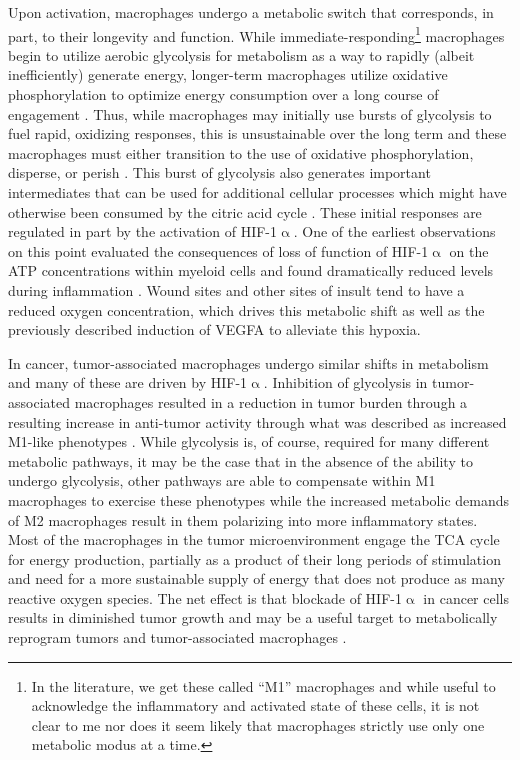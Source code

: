 Upon activation, macrophages undergo a metabolic switch that corresponds, in part, to their longevity and function. While immediate-responding\footnote{In the literature, we get these called ``M1'' macrophages and while useful to acknowledge the inflammatory and activated state of these cells, it is not clear to me nor does it seem likely that macrophages strictly use only one metabolic modus at a time.} macrophages begin to utilize aerobic glycolysis for metabolism as a way to rapidly (albeit inefficiently) generate energy, longer-term macrophages utilize oxidative phosphorylation to optimize energy consumption over a long course of engagement \citep{Kiran2016, Viola2019, Langston2017}. Thus, while macrophages may initially use bursts of glycolysis to fuel rapid, oxidizing responses, this is unsustainable over the long term and these macrophages must either transition to the use of oxidative phosphorylation, disperse, or perish \citep{Odegaard2011}. This burst of glycolysis also generates important intermediates that can be used for additional cellular processes which might have otherwise been consumed by the citric acid cycle \citep{Viola2019}. These initial responses are regulated in part by the activation of HIF-1$\upalpha$. One of the earliest observations on this point evaluated the consequences of loss of function of HIF-1$\upalpha$ on the ATP concentrations within myeloid cells and found dramatically reduced levels during inflammation \citep{Cramer2003}. Wound sites and other sites of insult tend to have a reduced oxygen concentration, which drives this metabolic shift as well as the previously described induction of VEGFA to alleviate this hypoxia. 

In cancer, tumor-associated macrophages undergo similar shifts in metabolism and many of these are driven by HIF-1$\upalpha$. Inhibition of glycolysis in tumor-associated macrophages resulted in a reduction in tumor burden through a resulting increase in anti-tumor activity through what was described as increased M1-like phenotypes \citep{Mehla2019}. While glycolysis is, of course, required for many different metabolic pathways, it may be the case that in the absence of the ability to undergo glycolysis, other pathways are able to compensate within M1 macrophages to exercise these phenotypes while the increased metabolic demands of M2 macrophages result in them polarizing into more inflammatory states. Most of the macrophages in the tumor microenvironment engage the TCA cycle for energy production, partially as a product of their long periods of stimulation and need for a more sustainable supply of energy that does not produce as many reactive oxygen species. The net effect is that blockade of HIF-1$\upalpha$ in cancer cells results in diminished tumor growth and may be a useful target to metabolically reprogram tumors and tumor-associated macrophages \citep{Hong2004}.

